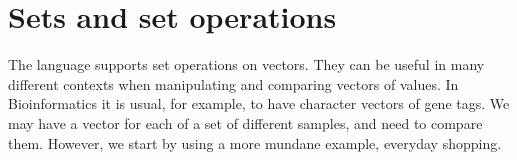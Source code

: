 \documentclass[krantz2]{krantz}\usepackage{knitr}%
\begin{document}

\section{Sets and set operations}

The \Rlang language supports set operations on vectors. They can be useful in many different contexts when manipulating and comparing vectors of values. In Bioinformatics it is usual, for example, to have character vectors of gene tags. We may have a vector for each of a set of different samples, and need to compare them. However, we start by using a more mundane example, everyday shopping.
\end{document}
